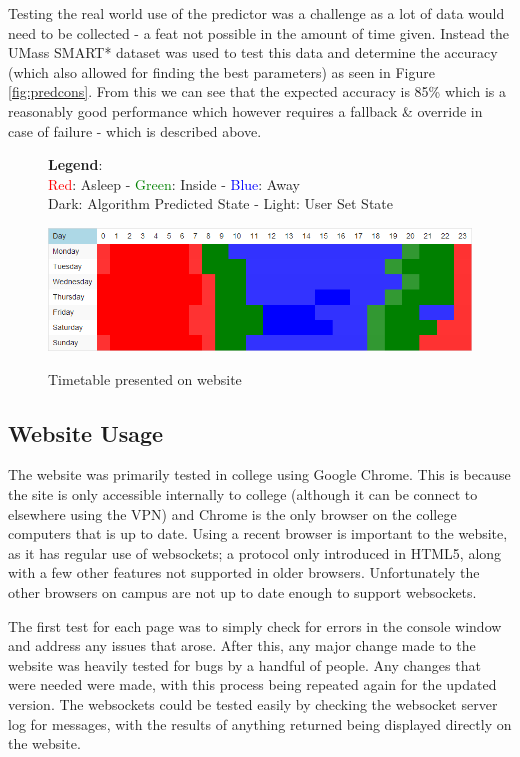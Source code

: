 \documentclass[10.5pt,a4paper,twoside]{report}   %
\begin{document}
Testing the real world use of the predictor was a challenge as a lot of data would need to be collected - a feat not possible in the amount of time given. Instead the UMass SMART* dataset\cite{umasssmart} was used to test this data and determine the accuracy (which also allowed for finding the best parameters) as seen in Figure \ref{fig:predcons}. From this we can see that the expected accuracy is 85\% which is a reasonably good performance which however requires a fallback \& override in case of failure - which is described above.
\begin{figure}[h!]
  \vspace{-10pt}
  \caption{Timetable presented on website}
\textbf{Legend}:\\ \textcolor{red}{Red}: Asleep - \textcolor{green}{Green}: Inside - \textcolor{blue}{Blue}: Away\\
Dark: Algorithm Predicted State - \textcolor{dark-gray}{Light}: User Set State

  \centering
    \includegraphics[width=1\textwidth]{images/ttble.png}
\label{fig:ttblweb}
  \vspace{-10pt}
\end{figure}
\FloatBarrier
\subsection{Website Usage}
The website was primarily tested in college using Google Chrome. This is because the site is only accessible internally to college (although it can be connect to elsewhere using the VPN) and Chrome is the only browser on the college computers that is up to date. Using a recent browser is important to the website, as it has regular use of websockets; a protocol only introduced in HTML5, along with a few other features not supported in older browsers. Unfortunately the other browsers on campus are not up to date enough to support websockets.

The first test for each page was to simply check for errors in the console window and address any issues that arose. After this, any major change made to the website was heavily tested for bugs by a handful of people. Any changes that were needed were made, with this process being repeated again for the updated version. The websockets could be tested easily by checking the websocket server log for messages, with the results of anything returned being displayed directly on the website.
\end{document}
